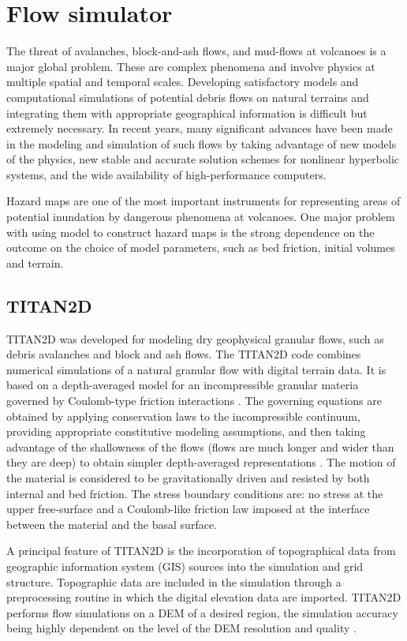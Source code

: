 \documentclass[12pt,letterpaper]{article}
\begin{document}
\section{Flow simulator}
The threat of avalanches, block-and-ash flows, and mud-flows at volcanoes is a major global problem.
These are complex phenomena and involve physics at multiple spatial and temporal scales. Developing satisfactory models and computational simulations of potential debris flows on natural terrains and integrating them with appropriate geographical information is difficult but extremely necessary. In recent years, many significant advances have been made in the modeling and simulation of such flows by taking advantage of new models of the physics, new stable and accurate solution schemes for nonlinear hyperbolic systems, and the wide availability of high-performance computers.

Hazard maps are one of the most important instruments \citep{Sheridan2010} for representing areas of potential inundation by
dangerous phenomena at volcanoes. One major problem with using model to construct hazard maps is the strong dependence on the outcome on the choice of model parameters, such as bed friction, initial volumes and terrain. 

\subsection{TITAN2D}
TITAN2D \citep{Patra2005, sheridan_2005} was developed for modeling dry geophysical granular flows,
such as debris avalanches and block and ash flows. The TITAN2D code
combines numerical simulations of a natural granular flow with digital
terrain data. It is based on a depth-averaged model for an
incompressible granular materia governed by Coulomb-type friction
interactions \citep{Savage1989}.  The governing equations are obtained
by applying conservation laws to the incompressible continuum,
providing appropriate constitutive modeling assumptions, and then
taking advantage of the shallowness of the flows (flows are much
longer and wider than they are deep) to obtain simpler depth-averaged
representations \citep{BuPaPi05}. The motion of the material is
considered to be gravitationally driven and resisted by both internal
and bed friction. The stress boundary conditions are: no stress at the
upper free-surface and a Coulomb-like friction law imposed at the
interface between the material and the basal surface.

A principal feature of TITAN2D is the incorporation of topographical data from geographic 
information system (GIS) sources into the simulation and grid structure. Topographic data 
are included in the simulation through a preprocessing routine in which the digital
elevation data are imported. TITAN2D performs flow simulations on a DEM of a desired 
region, the simulation accuracy being highly dependent on the level of the DEM resolution 
and quality \citep{stefanescu1}. 
\end{document}

